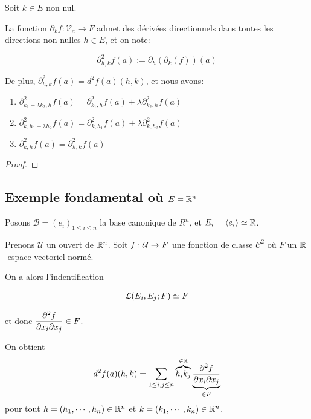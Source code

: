 \begin{proposition}
	Soit $k \in E$ non nul.

	La fonction $\partial_{k}f : \mathcal{V}_{a} \rightarrow F$ admet des
	dérivées directionnels dans toutes les directions non nulles $h \in E$, et
	on note:

	\begin{equation}
		\partial_{h, k}^{2} f (a) := \partial_{h} (\partial_{k}(f)) (a)
	\end{equation}

	De plus, $\partial_{h, k}^{2} f (a) = d^{2}f(a) (h, k)$, et nous avons:

	\begin{enumerate}
		\item $\partial_{k_{1} + \lambda k_{2}, h}^{2} f(a) =
			\partial_{k_{1}, h}^{2}f(a) + \lambda \partial_{k_{2}, h}^{2} f(a)$
		\item $\partial_{k, h_{1} + \lambda h_{2}}^{2} f(a) = \partial_{k,
				h_{1}}^{2} f(a) + \lambda \partial_{k, h_{2}}^{2} f(a)$
		\item $\partial_{k, h}^{2} f(a) = \partial_{h, k}^{2} f(a)$
	\end{enumerate}
\end{proposition}

\ifdefined\outputproof
\begin{proof}

\end{proof}
\fi

\subsection{Exemple fondamental où $E = \mathbb{R}^{n}$}

Posons $\mathcal{B} = (e_{i})_{1 \leq i \leq n}$ la base canonique de $R^{n}$,
et $E_{i} = \left<e_{i}\right> \simeq \mathbb{R}$.

Prenons $\mathcal{U}$ un ouvert de $\mathbb{R}^{n}$.
Soit $f : \mathcal{U} \rightarrow F$ une fonction de classe $\mathcal{C}^{2}$ où
$F$ un $\mathbb{R}$-espace vectoriel normé.

On a alors l'indentification

\begin{align*}
	\mathcal{L}(E_{i}, E_{j}; F) \simeq F
\end{align*}

et donc $ \displaystyle \pdv{f}{x_{i}}{x_{j}} (a) \in F$.

On obtient
\begin{equation*}
	d^{2}f(a) (h, k) = \displaystyle \sum_{1 \leq i, j \leq n} \overbrace{h_{i} k_{j}}^{\in
	\mathbb{R}} \underbrace{\pdv{f}{x_{i}}{x_{j}} (a)}_{\in F}
\end{equation*}
pour tout $h = (h_{1}, \cdots, h_{n}) \in \mathbb{R}^{n}$ et $k = (k_{1}, \cdots,
k_{n}) \in \mathbb{R}^{n}$.

